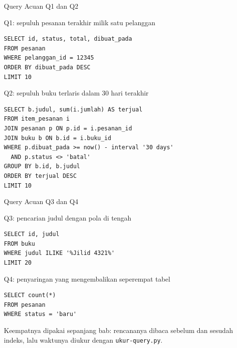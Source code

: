 \documentclass[aspectratio=169, table, 12pt]{beamer}
\begin{document}
\begin{frame}[fragile]{{\Large Query Acuan Q1 dan Q2}}
  \vspace{2pt}
  {\footnotesize Q1: sepuluh pesanan terakhir milik satu pelanggan\par}
\begin{lstlisting}[style=SqlStyle, basicstyle=\ttfamily\fontsize{7}{8.5}\selectfont]
SELECT id, status, total, dibuat_pada
FROM pesanan
WHERE pelanggan_id = 12345
ORDER BY dibuat_pada DESC
LIMIT 10
\end{lstlisting}

  \vspace{2pt}
  {\footnotesize Q2: sepuluh buku terlaris dalam 30 hari terakhir\par}
\begin{lstlisting}[style=SqlStyle, basicstyle=\ttfamily\fontsize{7}{8.5}\selectfont]
SELECT b.judul, sum(i.jumlah) AS terjual
FROM item_pesanan i
JOIN pesanan p ON p.id = i.pesanan_id
JOIN buku b ON b.id = i.buku_id
WHERE p.dibuat_pada >= now() - interval '30 days'
  AND p.status <> 'batal'
GROUP BY b.id, b.judul
ORDER BY terjual DESC
LIMIT 10
\end{lstlisting}
\end{frame}

\begin{frame}[fragile]{{\Large Query Acuan Q3 dan Q4}}
  \vspace{2pt}
  {\footnotesize Q3: pencarian judul dengan pola di tengah\par}
\begin{lstlisting}[style=SqlStyle]
SELECT id, judul
FROM buku
WHERE judul ILIKE '%Jilid 4321%'
LIMIT 20
\end{lstlisting}

  \vspace{4pt}
  {\footnotesize Q4: penyaringan yang mengembalikan seperempat tabel\par}
\begin{lstlisting}[style=SqlStyle]
SELECT count(*)
FROM pesanan
WHERE status = 'baru'
\end{lstlisting}

  \vspace{4pt}
  {\footnotesize Keempatnya dipakai sepanjang bab: rencananya dibaca sebelum
  dan sesudah indeks, lalu waktunya diukur dengan \texttt{ukur-query.py}.}
\end{frame}
\end{document}
